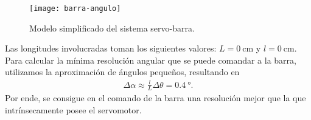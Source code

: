 \begin{figure}[!tbp]
    \centering
    \texttt{[image: barra-angulo]}
    \caption{Modelo simplificado del sistema servo-barra.}
    \label{fig:angulo-barra}
\end{figure}

Las longitudes involucradas toman los siguientes valores: $L = \qty{0}{\cm}$ y $l = \qty{0}{\cm}$. Para calcular la mínima resolución angular que se puede comandar a la barra, utilizamos la aproximación de ángulos pequeños, resultando en
\begin{align*}
    \Delta\alpha \approx \frac{l}{L} \Delta \theta = \qty{0.4}{\degree}.
\end{align*}
Por ende, se consigue en el comando de la barra una resolución mejor que la que intrínsecamente posee el servomotor.


